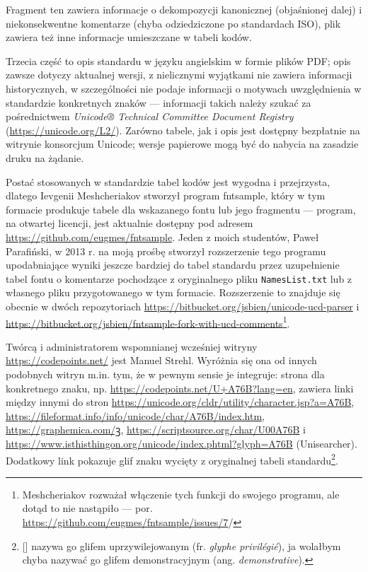Fragment ten zawiera informacje o dekompozycji kanonicznej
(objaśnionej dalej) i niekonsekwentne komentarze (chyba odziedziczone po
standardach ISO), plik zawiera też inne informacje umieszczane w tabeli
kodów.

Trzecia część to opis standardu w języku angielskim w formie plików
PDF; opis zawsze dotyczy aktualnej wersji, z nielicznymi wyjątkami nie
zawiera informacji historycznych, w szczególności nie podaje
informacji o motywach uwzględnienia w standardzie konkretnych znaków
--- informacji takich należy szukać za pośrednictwem \textit{Unicode®
  Technical Committee Document Registry}
(\url{https://unicode.org/L2/}). Zarówno tabele, jak i opis jest
dostępny bezpłatnie na witrynie konsorcjum Unicode; wersje papierowe
mogą być do nabycia na zasadzie druku na żądanie.

Postać stosowanych w standardzie tabel kodów jest wygodna i
przejrzysta, dlatego Ievgenii Meshcheriakov stworzył program
\textsf{fntsample}, który w tym formacie produkuje tabele dla
wskazanego fontu lub jego fragmentu --- program, na otwartej licencji,
jest aktualnie dostępny pod adresem
\url{https://github.com/eugmes/fntsample}. Jeden z moich studentów,
Paweł Parafiński, w 2013 r. na moją prośbę stworzył rozszerzenie tego
programu upodabniające wyniki jeszcze bardziej do tabel standardu
przez uzupełnienie tabel fontu o komentarze pochodzące z oryginalnego
pliku \texttt{NamesList.txt} lub z własnego pliku przygotowanego w tym
formacie. Rozszerzenie to znajduje się obecnie w dwóch repozytoriach
\url{https://bitbucket.org/jsbien/unicode-ucd-parser} i
\url{https://bitbucket.org/jsbien/fntsample-fork-with-ucd-comments}\footnote{Meshcheriakov
  rozważał włączenie tych funkcji do swojego programu, ale dotąd to
  nie nastąpiło ---
  por. \url{https://github.com/eugmes/fntsample/issues/7}/}.

Twórcą i administratorem wspomnianej wcześniej witryny
\url{https://codepoints.net/} jest Manuel Strehl. Wyróżnia się ona od
innych podobnych witryn m.in. tym, że w pewnym sensie je integruje:
strona dla konkretnego znaku,
np. \url{https://codepoints.net/U+A76B?lang=en}, zawiera linki między
innymi do stron
\url{https://unicode.org/cldr/utility/character.jsp?a=A76B},
\url{https://fileformat.info/info/unicode/char/A76B/index.htm},
\url{https://graphemica.com/ꝫ},
\url{https://scriptsource.org/char/U00A76B} i
\url{https://www.isthisthingon.org/unicode/index.phtml?glyph=A76B}
(Unisearcher). Dodatkowy link %
pokazuje glif znaku wycięty z oryginalnej tabeli
standardu\footnote{%
  [\cite{haralambous02:_unicod}] nazywa go glifem uprzywilejowanym
  (fr. \textit{glyphe privilégié}), ja wolałbym chyba nazywać go
  glifem demonstracyjnym (ang. \textit{demonstrative}).}.

